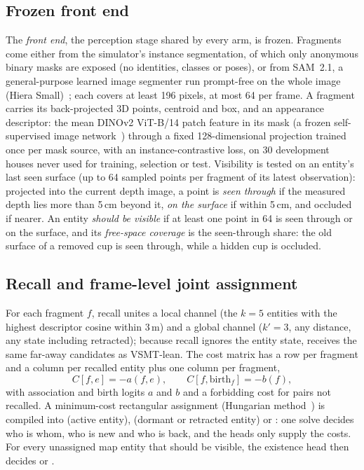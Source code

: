 \subsection{Frozen front end}
\label{sec:frontend}
The \emph{front end}, the perception stage shared by every arm, is frozen.
Fragments come either from the simulator's instance segmentation, of which only anonymous binary masks are exposed (no identities, classes or poses), or from SAM~2.1, a general-purpose learned image segmenter run prompt-free on the whole image (Hiera Small)~\cite{sam2_2025,sam21release}; each covers at least 196 pixels, at most 64 per frame.
A fragment carries its back-projected 3D points, centroid and box, and an appearance descriptor: the mean DINOv2 ViT-B/14 patch feature in its mask (a frozen self-supervised image network~\cite{dinov2_2024}) through a fixed 128-dimensional projection trained once per mask source, with an instance-contrastive loss, on 30 development houses never used for training, selection or test.
Visibility is tested on an entity's last seen surface (up to 64 sampled points per fragment of its latest observation): projected into the current depth image, a point is \emph{seen through} if the measured depth lies more than 5\,cm beyond it, \emph{on the surface} if within 5\,cm, and occluded if nearer.
An entity \emph{should be visible} if at least one point in 64 is seen through or on the surface, and its \emph{free-space coverage} is the seen-through share: the old surface of a removed cup is seen through, while a hidden cup is occluded.
\subsection{Recall and frame-level joint assignment}
For each fragment $f$, recall unites a local channel (the $k{=}5$ entities with the highest descriptor cosine within 3\,m) and a global channel ($k'{=}3$, any distance, any state including retracted); because recall ignores the entity state,  receives the same far-away candidates as VSMT-lean.
The cost matrix has a row per fragment and a column per recalled entity plus one  column per fragment,
\begin{equation}
C[f,e]=-a(f,e),\qquad C[f,\mathrm{birth}_f]=-b(f),
\label{eq:cost}
\end{equation}
with association and birth logits $a$ and $b$ and a forbidding cost for pairs not recalled.
A minimum-cost rectangular assignment (Hungarian method~\cite{kuhn1955}) is compiled into  (active entity),  (dormant or retracted entity) or : one solve decides who is whom, who is new and who is back, and the heads only supply the costs.
For every unassigned map entity that should be visible, the existence head then decides  or .

